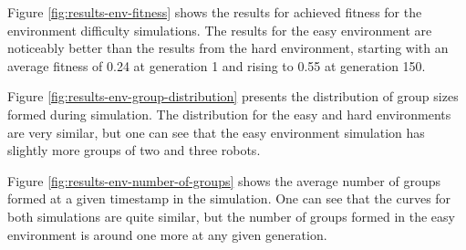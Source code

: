\vspace*{\fill}

Figure \ref{fig:results-env-fitness} shows the results for achieved fitness for the environment difficulty simulations.
The results for the easy environment are noticeably better than the results from the hard environment, starting with an average fitness of 0.24 at generation 1 and rising to 0.55 at generation 150. 

\vspace*{\fill}

\newpage

\vspace*{\fill}

Figure \ref{fig:results-env-group-distribution} presents the distribution of group sizes formed during simulation. The distribution for the easy and hard environments are very similar, but one can see that the easy environment simulation has slightly more groups of two and three robots.

\vspace*{\fill}
\newpage

\vspace*{\fill}

Figure \ref{fig:results-env-number-of-groups} shows the average number of groups formed at a given timestamp in the simulation.
One can see that the curves for both simulations are quite similar, but the number of groups formed in the easy environment is around one more at any given generation.

\vspace*{\fill}
\newpage
\vspace*{\fill}


